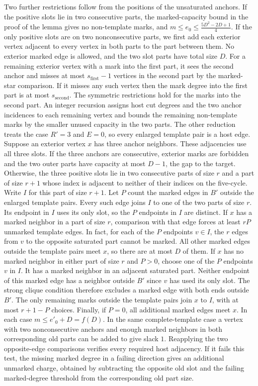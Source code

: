 Two further restrictions follow from the positions of the unsaturated anchors. If the positive
slots lie in two consecutive parts, the marked-capacity bound in the proof of the lemma
gives no non-template marks, and $m\leq e_0\leq \frac{5D^2-2D+1}{4}$.
If the only positive slots are on two nonconsecutive parts, we first add each exterior vertex adjacent to every vertex in both parts
to the part between them. No exterior marked edge is allowed, and the two slot parts
have total size $D$. For a remaining exterior vertex with a mark into
the first part, it sees the second anchor and misses at most
$s_{\mathrm{first}}-1$ vertices in the second part by the marked-star
comparison. If it misses any such vertex then the mark degree into the
first part is at most $s_{\mathrm{second}}$. The symmetric restrictions
hold for the marks into the second part. An integer recursion assigns
host cut degrees and the two anchor incidences to each remaining
vertex and bounds the remaining non-template marks by the smaller
unused capacity in the two parts. The other reduction treats the
case $R'=3$ and $E=0$, so every enlarged template pair is a host
edge. Suppose an exterior vertex $x$ has three anchor neighbors.
These adjacencies use all three slots. If the three anchors
are consecutive, exterior marks are forbidden and the two outer
parts have capacity at most $D-1$, the gap to the target.
Otherwise, the three positive slots lie in two consecutive parts
of size $r$ and a part of size $r+1$ whose index is adjacent to
neither of their indices on the five-cycle.
Write $I$ for this part of size $r+1$. Let $P$ count the marked
edges in $B'$ outside the enlarged template pairs. Every such edge
joins $I$ to one of the two parts of size $r$. Its endpoint in $I$
uses its only slot, so the $P$ endpoints in $I$ are distinct. If $x$
has a marked neighbor in a part of size $r$, comparison with that
edge forces at least $rP$ unmarked template edges. In fact, for
each of the $P$ endpoints $v\in I$, the $r$ edges from $v$ to the
opposite saturated part cannot be marked. All other marked edges
outside the template pairs meet $x$, so there are at most $D$ of
them. If $x$ has no marked neighbor in either part of size $r$
and $P>0$, choose one of the $P$ endpoints $v$ in $I$. It has a
marked neighbor in an adjacent saturated part. Neither endpoint
of this marked edge has a neighbor outside $B'$ since $v$ has used
its only slot. The strong clique condition therefore excludes a
marked edge with both ends outside $B'$. The only remaining marks
outside the template pairs join $x$ to $I$, with at most $r+1-P$
choices. Finally, if $P=0$, all additional marked edges meet $x$.
In each case $m\leq e'_0+D=f(D)$. In the same complete-template case a
vertex with two nonconsecutive anchors and enough marked neighbors
in both corresponding old parts can be added to give slack $1$.
Reapplying the two opposite-edge comparisons verifies every
required host adjacency. If it fails this test, the missing marked
degree in a failing direction gives an additional unmarked charge,
obtained by subtracting the opposite old slot and the failing
marked-degree threshold from the corresponding old part size.

